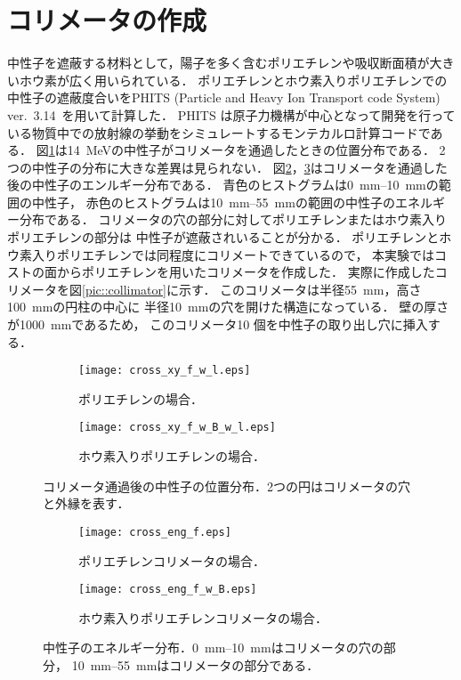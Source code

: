 \documentclass[../master]{subfiles}
\begin{document}
\section{コリメータの作成}
中性子を遮蔽する材料として，陽子を多く含むポリエチレンや吸収断面積が大きいホウ素が広く用いられている．
ポリエチレンとホウ素入りポリエチレンでの中性子の遮蔽度合いをPHITS (Particle and Heavy Ion Transport code System)
ver.~3.14~\cite{phits}を用いて計算した．
PHITS は原子力機構が中心となって開発を行っている物質中での放射線の挙動をシミュレートするモンテカルロ計算コードである．
図\ref{collimator_xy_pos}は\SI{14}{\mega\electronvolt}の中性子がコリメータを通過したときの位置分布である．
2つの中性子の分布に大きな差異は見られない．
図\ref{fig::neutron_energy_dist}，\ref{fig::neutron_energy_dist_w_B}はコリメータを通過した後の中性子のエンルギー分布である．
青色のヒストグラムは\SIrange{0}{10}{\milli\metre}の範囲の中性子，
赤色のヒストグラムは\SIrange{10}{55}{\milli\metre}の範囲の中性子のエネルギー分布である．
コリメータの穴の部分に対してポリエチレンまたはホウ素入りポリエチレンの部分は
中性子が遮蔽されいることが分かる．
ポリエチレンとホウ素入りポリエチレンでは同程度にコリメートできているので，
本実験ではコストの面からポリエチレンを用いたコリメータを作成した．
実際に作成したコリメータを図\ref{pic::collimator}に示す．
このコリメータは半径\SI{55}{\milli\metre}，高さ\SI{100}{\milli\metre}の円柱の中心に
半径\SI{10}{\milli\metre}の穴を開けた構造になっている．
壁の厚さが\SI{1000}{\milli\metre}であるため，
このコリメータ10 個を中性子の取り出し穴に挿入する．
\begin{figure}
  \centering
  \begin{subfigure}{\columnwidth}
    \centering
    \texttt{[image: cross\_xy\_f\_w\_l.eps]}
    \caption{ポリエチレンの場合．}
  \end{subfigure}
  \begin{subfigure}{\columnwidth}
    \centering
    \texttt{[image: cross\_xy\_f\_w\_B\_w\_l.eps]}
    \caption{ホウ素入りポリエチレンの場合．}
  \end{subfigure}
  \caption[コリメータ通過後の中性子の位置分布．]
          {コリメータ通過後の中性子の位置分布．2つの円はコリメータの穴と外縁を表す．}
  \label{collimator_xy_pos}
\end{figure}
\begin{figure}
  \begin{subfigure}{\columnwidth}
    \centering
    \texttt{[image: cross\_eng\_f.eps]}
    \caption{ポリエチレンコリメータの場合．}
    \label{fig::neutron_energy_dist}
  \end{subfigure}
  \begin{subfigure}{\columnwidth}
    \centering
    \texttt{[image: cross\_eng\_f\_w\_B.eps]}
    \caption{ホウ素入りポリエチレンコリメータの場合．}
    \label{fig::neutron_energy_dist_w_B}
  \end{subfigure}
  \caption[中性子のエネルギー分布．]
          {中性子のエネルギー分布．\SIrange{0}{10}{\milli\metre}はコリメータの穴の部分，
          \SIrange{10}{55}{\milli\metre}はコリメータの部分である．}
  \label{fig::neutron_energy}
\end{figure}
\end{document}
